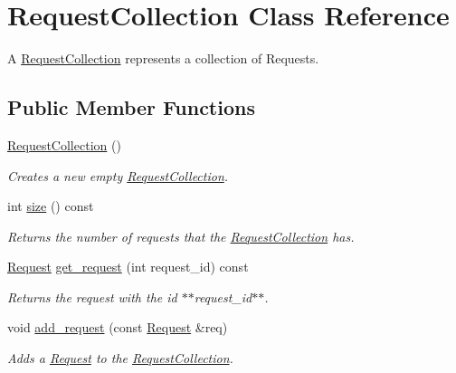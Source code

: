 \hypertarget{class_request_collection}{
\section{RequestCollection Class Reference}
\label{class_request_collection}
}


A \hyperlink{class_request_collection}{RequestCollection} represents a collection of Requests.  


\subsection*{Public Member Functions}
\begin{DoxyCompactItemize}
\item 
\hyperlink{class_request_collection_a185bbbd64b7f3fbc8602c1aeb5ef2ddf}{RequestCollection} ()
\begin{DoxyCompactList}\small\item\em Creates a new empty \hyperlink{class_request_collection}{RequestCollection}. \item\end{DoxyCompactList}\item 
int \hyperlink{class_request_collection_ad056be9f8a0bb2708b994a45b08361c6}{size} () const 
\begin{DoxyCompactList}\small\item\em Returns the number of requests that the \hyperlink{class_request_collection}{RequestCollection} has. \item\end{DoxyCompactList}\item 
\hyperlink{class_request}{Request} \hyperlink{class_request_collection_a7508ef48dadaa511a9be1dec2c3e3c43}{get\_\-request} (int request\_\-id) const 
\begin{DoxyCompactList}\small\item\em Returns the request with the id $\ast$$\ast$request\_\-id$\ast$$\ast$. \item\end{DoxyCompactList}\item 
void \hyperlink{class_request_collection_ae3697bf1a2308203c8f4c375d71dc934}{add\_\-request} (const \hyperlink{class_request}{Request} \&req)
\begin{DoxyCompactList}\small\item\em Adds a \hyperlink{class_request}{Request} to the \hyperlink{class_request_collection}{RequestCollection}. \item\end{DoxyCompactList}\end{DoxyCompactItemize}


